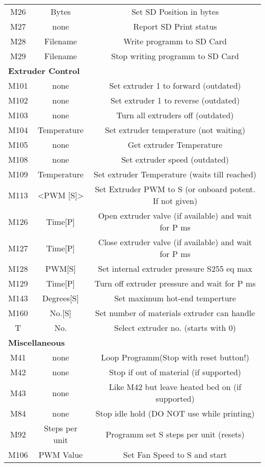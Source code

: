 \begin{landscape}
\begin{longtable}{c|c|c}
  
  M26	& Bytes & Set SD Position in bytes \\
  M27	& none	& Report SD Print status \\
  M28	& Filename & Write programm to SD Card \\ 
  M29	& Filename & Stop writing programm to SD Card \\
  \hline \multicolumn{3}{l}{\textbf{Extruder Control}} \\
  M101	& none & Set extruder 1 to forward (outdated) \\ 
  M102	& none & Set extruder 1 to reverse (outdated) \\
  M103	& none & Turn all extruders off (outdated) \\
  M104	& Temperature & Set extruder temperature (not waiting) \\
  M105 	& none & Get extruder Temperature \\
  M108	& none & Set extruder speed (outdated) \\ 
  M109	& Temperature & Set extruder Temperature (waits till reached) \\
  M113	& <PWM [S]> & Set Extruder PWM to S (or onboard potent. If not given) \\
  M126	& Time[P] & Open extruder valve (if available) and wait for P ms \\
  M127	& Time[P] & Close extruder valve (if available) and wait for P ms \\
  M128 & PWM[S] & Set internal extruder pressure S255 eq max \\
  M129	& Time[P] & Turn off extruder pressure and wait for P ms \\
  M143	& Degrees[S]	& Set maximum hot-end temperture \\
  M160 	& No.[S] 	& Set number of materials extruder can handle \\
  T	& No. & Select extruder no. (starts with 0) \\
  \hline \multicolumn{3}{l}{\textbf{Miscellaneous}} \\
  M41	& none & Loop Programm(Stop with reset button!) \\
  M42	& none & Stop if out of material (if supported) \\ 
  M43	& none & Like M42 but leave heated bed on (if supported) \\
  M84 	& none & Stop idle hold (DO NOT use while printing\!) \\
  M92	& Steps per unit & Programm set S steps per unit (resets) \\ 
  M106	& PWM Value & Set Fan Speed to S and start \\

\end{longtable}
\end{landscape}
